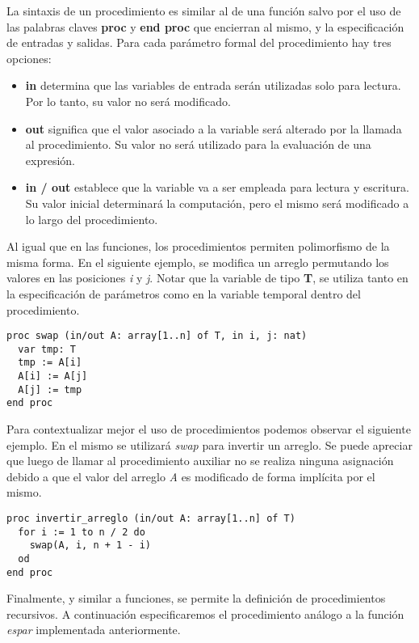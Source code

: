 \documentclass{article}
\begin{document}
La sintaxis de un procedimiento es similar al de una función salvo por el uso de las palabras claves \textbf{proc} y \textbf{end proc} que encierran al mismo, y la especificación de entradas y salidas.
Para cada parámetro formal del procedimiento hay tres opciones:

\begin{itemize}
\item \textbf{in} determina que las variables de entrada serán utilizadas solo para lectura.
Por lo tanto, su valor no será modificado.
\item \textbf{out} significa que el valor asociado a la variable será alterado por la llamada al procedimiento.
Su valor no será utilizado para la evaluación de una expresión.
\item \textbf{in / out} establece que la variable va a ser empleada para lectura y escritura.
Su valor inicial determinará la computación, pero el mismo será modificado a lo largo del procedimiento.
\end{itemize}

Al igual que en las funciones, los procedimientos permiten polimorfismo de la misma forma.
En el siguiente ejemplo, se modifica un arreglo permutando los valores en las posiciones \textit{i} y \textit{j}.
Notar que la variable de tipo \textbf{T}, se utiliza tanto en la especificación de parámetros como en la variable temporal dentro del procedimiento.

\begin{lstlisting}
proc swap (in/out A: array[1..n] of T, in i, j: nat)
  var tmp: T
  tmp := A[i]
  A[i] := A[j]
  A[j] := tmp
end proc
\end{lstlisting}

Para contextualizar mejor el uso de procedimientos podemos observar el siguiente ejemplo.
En el mismo se utilizará \textit{swap} para invertir un arreglo.
Se puede apreciar que luego de llamar al procedimiento auxiliar no se realiza ninguna asignación debido a que el valor del arreglo \textit{A} es modificado de forma implícita por el mismo.

\begin{lstlisting}
proc invertir_arreglo (in/out A: array[1..n] of T)
  for i := 1 to n / 2 do
    swap(A, i, n + 1 - i)
  od
end proc
\end{lstlisting}

Finalmente, y similar a funciones, se permite la definición de procedimientos recursivos.
A continuación especificaremos el procedimiento análogo a la función \textit{es\gbajo par} implementada anteriormente.
\end{document}
